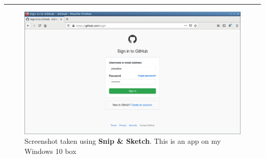 \documentclass[10pt,fleqn]{article}
\begin{document}
\vskip0.1in\hrule\vskip0.1in
\vfill
\begin{figure}[h]
\centering
\includegraphics[width=5.0in]{../images/github_03.png}
\caption{{Screenshot} taken using {\bf Snip \& Sketch}. This is an app on
         my Windows 10 box}
\end{figure}
\eject
\end{document}
